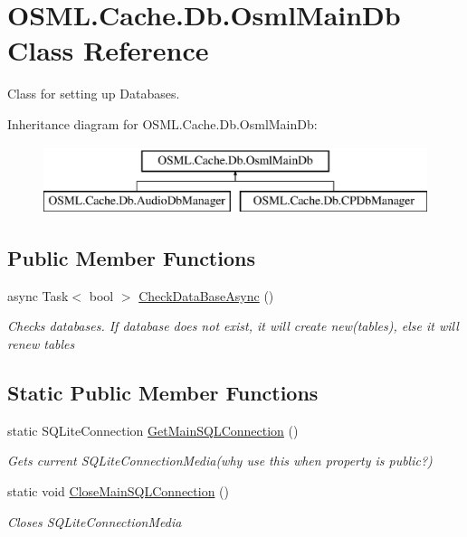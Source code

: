 \hypertarget{classOSML_1_1Cache_1_1Db_1_1OsmlMainDb}{}\section{O\+S\+M\+L.\+Cache.\+Db.\+Osml\+Main\+Db Class Reference}
\label{classOSML_1_1Cache_1_1Db_1_1OsmlMainDb}


Class for setting up Databases.  


Inheritance diagram for O\+S\+M\+L.\+Cache.\+Db.\+Osml\+Main\+Db\+:\begin{figure}[H]
\begin{center}
\leavevmode
\includegraphics[height=2.000000cm]{classOSML_1_1Cache_1_1Db_1_1OsmlMainDb}
\end{center}
\end{figure}
\subsection*{Public Member Functions}
\begin{DoxyCompactItemize}
\item 
async Task$<$ bool $>$ \mbox{\hyperlink{classOSML_1_1Cache_1_1Db_1_1OsmlMainDb_a4748246289a9eea7ef4b8dbe25c92c75}{Check\+Data\+Base\+Async}} ()
\begin{DoxyCompactList}\small\item\em Checks databases. If database does not exist, it will create new(tables), else it will renew tables \end{DoxyCompactList}\end{DoxyCompactItemize}
\subsection*{Static Public Member Functions}
\begin{DoxyCompactItemize}
\item 
static S\+Q\+Lite\+Connection \mbox{\hyperlink{classOSML_1_1Cache_1_1Db_1_1OsmlMainDb_a8ad5975e7c26607bcedb85395e733b31}{Get\+Main\+S\+Q\+L\+Connection}} ()
\begin{DoxyCompactList}\small\item\em Gets current S\+Q\+Lite\+Connection\+Media(why use this when property is public?) \end{DoxyCompactList}\item 
static void \mbox{\hyperlink{classOSML_1_1Cache_1_1Db_1_1OsmlMainDb_ae7eb2ebd6c06c19cc0b74187d40a4b12}{Close\+Main\+S\+Q\+L\+Connection}} ()
\begin{DoxyCompactList}\small\item\em Closes S\+Q\+Lite\+Connection\+Media \end{DoxyCompactList}\end{DoxyCompactItemize}
